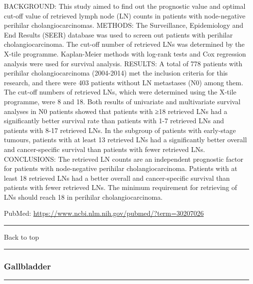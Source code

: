 \documentclass[]{article}
\begin{document}
BACKGROUND: This study aimed to find out the prognostic value and
optimal cut-off value of retrieved lymph node (LN) counts in patients
with node-negative perihilar cholangiocarcinomas. METHODS: The
Surveillance, Epidemiology and End Results (SEER) database was used to
screen out patients with perihilar cholangiocarcinoma. The cut-off
number of retrieved LNs was determined by the X-tile programme.
Kaplan-Meier methods with log-rank tests and Cox regression analysis
were used for survival analysis. RESULTS: A total of 778 patients with
perihilar cholangiocarcinoma (2004-2014) met the inclusion criteria for
this research, and there were 403 patients without LN metastases (N0)
among them. The cut-off numbers of retrieved LNs, which were determined
using the X-tile programme, were 8 and 18. Both results of univariate
and multivariate survival analyses in N0 patients showed that patients
with ≥18 retrieved LNs had a significantly better survival rate than
patients with 1-7 retrieved LNs and patients with 8-17 retrieved LNs. In
the subgroup of patients with early-stage tumours, patients with at
least 13 retrieved LNs had a significantly better overall and
cancer-specific survival than patients with fewer retrieved LNs.
CONCLUSIONS: The retrieved LN counts are an independent prognostic
factor for patients with node-negative perihilar cholangiocarcinoma.
Patients with at least 18 retrieved LNs had a better overall and
cancer-specific survival than patients with fewer retrieved LNs. The
minimum requirement for retrieving of LNs should reach 18 in perihilar
cholangiocarcinoma.

PubMed: \url{https://www.ncbi.nlm.nih.gov/pubmed/?term=30207026}

{}

{}

\begin{center}\rule{0.5\linewidth}{\linethickness}\end{center}

Back to top

\begin{center}\rule{0.5\linewidth}{\linethickness}\end{center}

\pagebreak

\hypertarget{gallbladder}{%
\subsubsection{Gallbladder}\label{gallbladder}}

\begin{center}\rule{0.5\linewidth}{\linethickness}\end{center}
\end{document}
